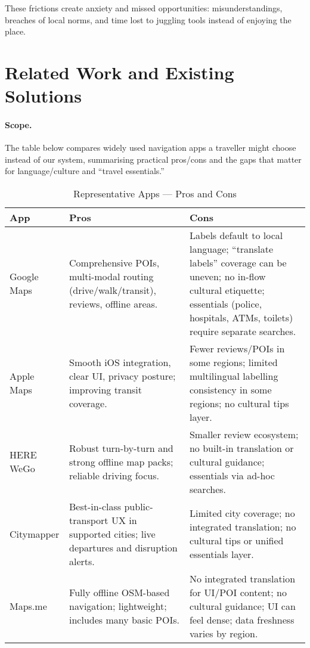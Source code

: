 \begin{sloppypar}
\medskip

These frictions create anxiety and missed opportunities: misunderstandings, breaches of local norms, and time lost to juggling tools instead of enjoying the place.

\section{Related Work and Existing Solutions}
\paragraph{Scope.}
The table below compares widely used navigation apps a traveller might choose instead of our system, summarising practical pros/cons and the gaps that matter for language/culture and “travel essentials.”

\begin{table}[H]
  \centering
  \caption{Representative Apps — Pros and Cons}
  \label{tab:per-app}
  \begin{tabular}{|p{3cm}|p{5.2cm}|p{5.2cm}|}
    \hline
    \textbf{App} & \textbf{Pros} & \textbf{Cons} \\
    \hline
    Google Maps \cite{googlemaps} &
      Comprehensive POIs, multi-modal routing (drive/walk/transit), reviews, offline areas. &
      Labels default to local language; “translate labels” coverage can be uneven; no in-flow cultural etiquette; essentials (police, hospitals, ATMs, toilets) require separate searches. \\
    \hline
    Apple Maps \cite{applemaps} &
      Smooth iOS integration, clear UI, privacy posture; improving transit coverage. &
      Fewer reviews/POIs in some regions; limited multilingual labelling consistency in some regions; no cultural tips layer. \\
    \hline
    HERE WeGo \cite{herewego} &
      Robust turn-by-turn and strong offline map packs; reliable driving focus. &
      Smaller review ecosystem; no built-in translation or cultural guidance; essentials via ad-hoc searches. \\
    \hline
    Citymapper \cite{citymapper} &
      Best-in-class public-transport UX in supported cities; live departures and disruption alerts. &
      Limited city coverage; no integrated translation; no cultural tips or unified essentials layer. \\
    \hline
    Maps.me \cite{mapsme} &
      Fully offline OSM-based navigation; lightweight; includes many basic POIs. &
      No integrated translation for UI/POI content; no cultural guidance; UI can feel dense; data freshness varies by region. \\
    \hline
  \end{tabular}


\end{table}
\end{sloppypar}

